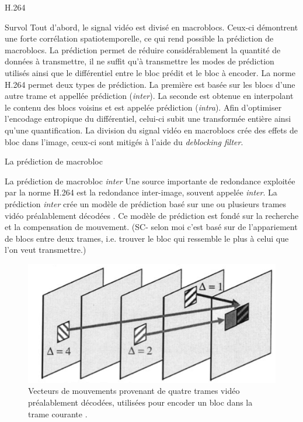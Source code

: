 \documentclass{article}
\begin{document}
\begin{section}{H.264}
\begin{subsection}{Survol}
Tout d'abord, le signal vidéo est divisé en macroblocs. Ceux-ci démontrent une
forte corrélation spatiotemporelle, ce qui rend possible la prédiction de
macroblocs. La prédiction permet de réduire considérablement la quantité de données à
transmettre, il ne suffit qu'à transmettre les modes de prédiction utilisés ainsi que le
différentiel entre le bloc prédit et le bloc à encoder. La norme H.264 permet
deux types de prédiction. La première est basée sur les blocs d'une autre trame et appellée prédiction
(\textit{inter}). La seconde est obtenue en interpolant le contenu des blocs voisins et est appelée prédiction 
(\textit{intra}). Afin d'optimiser l'encodage entropique du différentiel,
celui-ci subit une transformée entière ainsi qu'une quantification. La division
du signal vidéo en macroblocs crée des effets de bloc dans l'image, ceux-ci sont
mitigés à l'aide du \textit{deblocking filter}.
\end{subsection}

\begin{subsection}{La prédiction de macrobloc}
\begin{subsubsection}{La prédiction de macrobloc \textit{inter}}
\newcommand{\ltMIN}[1]{\arg \min_{#1}}
\newcommand{\ltSAD}[1]{\textrm{SAD}(#1)}
\newcommand{\ltC}[1]{\mathbf{C}_{#1}}
\newcommand{\ltR}[1]{\mathbf{R}_{#1}}
Une source importante de redondance exploitée par la norme H.264 est la
redondance inter-image, souvent appelée \textit{inter}. La prédiction
\textit{inter} crée un modèle de prédiction basé sur une ou plusieurs trames
vidéo préalablement décodées \cite{richardson2003}. Ce modèle de prédiction est
fondé sur la recherche et la compensation de mouvement. (SC- selon moi c'est basé sur de l'appariement de blocs entre deux trames, i.e. trouver le bloc qui ressemble le plus à celui que l'on veut transmettre.)

\begin{figure}[htb]
\centering
\includegraphics[scale=0.5]{images/multipicture.png}
\caption{Vecteurs de mouvements provenant de quatre trames vidéo préalablement
décodées, utilisées pour encoder un bloc dans la trame courante 
\cite{schafer2003}.}
\label{fig-MultiPicture}
\end{figure}


\end{subsubsection}
\end{subsection}
\end{section}
\end{document}
